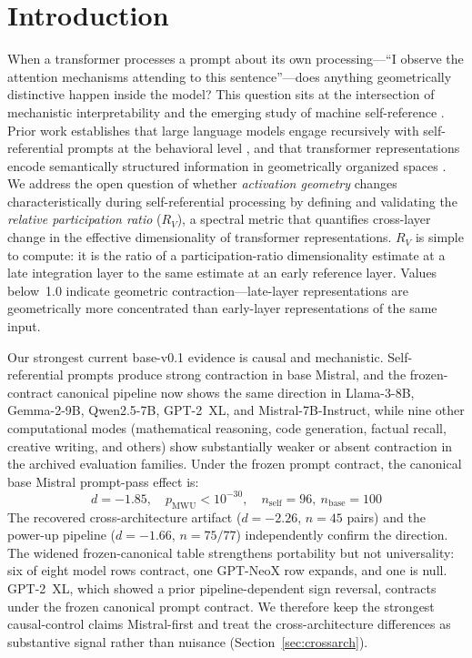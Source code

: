 \documentclass{article}
\newcommand{\RV}{R_V}
\newcommand{\dcohen}{d}
\begin{document}
\section{Introduction}
\label{sec:intro}

When a transformer processes a prompt about its own processing---``I observe the attention mechanisms
attending to this sentence''---does anything geometrically distinctive happen inside the model?
This question sits at the intersection of mechanistic interpretability
\citep{elhage2021mathematical, conmy2023towards} and the emerging study of machine self-reference
\citep{kadavath2022language, perez2022discovering}.
Prior work establishes that large language models engage recursively with self-referential prompts
at the behavioral level \citep{chen2024self}, and that transformer representations encode
semantically structured information in geometrically organized spaces \citep{park2024geometry,
marks2024geometry}.
We address the open question of whether \emph{activation geometry} changes characteristically
during self-referential processing by defining and validating the \emph{relative participation
ratio} ($\RV$), a spectral metric that quantifies cross-layer change in the effective
dimensionality of transformer representations.
$\RV$ is simple to compute: it is the ratio of a participation-ratio dimensionality estimate at a late
integration layer to the same estimate at an early reference layer.
Values below~1.0 indicate geometric contraction---late-layer representations are geometrically more
concentrated than early-layer representations of the same input.

Our strongest current base-v0.1 evidence is causal and mechanistic.
Self-referential prompts produce strong contraction in base Mistral, and the frozen-contract
canonical pipeline now shows the same direction in Llama-3-8B, Gemma-2-9B, Qwen2.5-7B,
GPT-2~XL, and Mistral-7B-Instruct, while nine other computational modes (mathematical
reasoning, code generation, factual recall, creative writing, and others) show substantially
weaker or absent contraction in the archived evaluation families.
Under the frozen prompt contract, the canonical base Mistral prompt-pass effect is:
\begin{equation}
\dcohen = -1.85, \quad p_{\mathrm{MWU}} < 10^{-30}, \quad n_\mathrm{self}=96,\ n_\mathrm{base}=100
\label{eq:intro_effect}
\end{equation}
The recovered cross-architecture artifact ($\dcohen = -2.26$, $n = 45$ pairs) and the power-up
pipeline ($\dcohen = -1.66$, $n = 75/77$) independently confirm the direction.
The widened frozen-canonical table strengthens portability but not universality:
six of eight model rows contract, one GPT-NeoX row expands, and one is null.
GPT-2~XL, which showed a prior pipeline-dependent sign reversal, contracts under the frozen
canonical prompt contract.
We therefore keep the strongest causal-control claims Mistral-first and treat the
cross-architecture differences as substantive signal rather than nuisance
(Section~\ref{sec:crossarch}).
\end{document}
